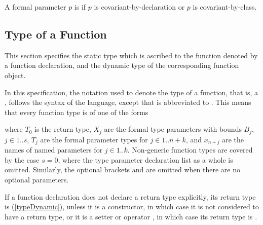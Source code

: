 \documentclass[makeidx]{article}
\begin{document}
\LMHash{}%
A formal parameter $p$ is
if $p$ is covariant-by-declaration or $p$ is covariant-by-class.



\subsection{Type of a Function}

\LMHash{}%
This section specifies the static type which is ascribed to
the function denoted by a function declaration,
and the dynamic type of the corresponding function object.

\LMHash{}%
In this specification,
the notation used to denote the type of a function,
that is, a ,
follows the syntax of the language,
except that \EXTENDS{} is abbreviated to
\FunctionTypeExtends.
This means that every function type is of one of the forms

\noindent
where $T_0$ is the return type,
$X_j$ are the formal type parameters with bounds $B_j$, $j \in 1 .. s$,
$T_j$ are the formal parameter types for $j \in 1 .. n + k$,
and $x_{n+j}$ are the names of named parameters for $j \in 1 .. k$.
Non-generic function types are covered by the case $s = 0$,
where the type parameter declaration list
\code{<\ldots{}>}
as a whole is omitted.
%
Similarly, the optional brackets \code{[]} and \code{\{\}} are omitted
when there are no optional parameters.


\LMHash{}%
If a function declaration does not declare a return type explicitly,
its return type is \DYNAMIC{} (\ref{typeDynamic}),
unless it is a constructor,
in which case it is not considered to have a return type,
or it is a setter or operator \code{[]=},
in which case its return type is \VOID{}.
\end{document}
